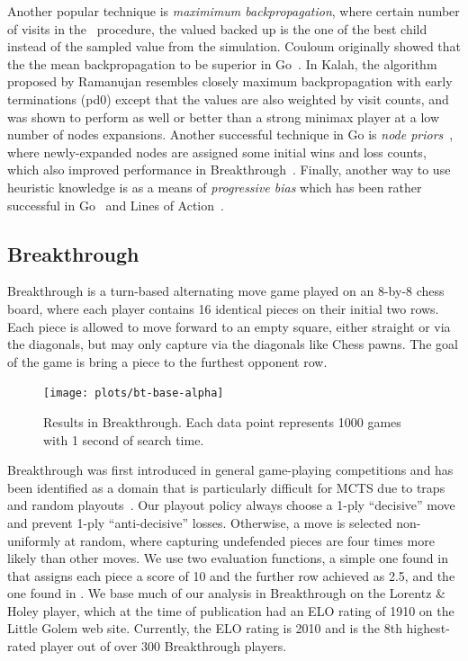 \documentclass[letterpaper]{article}
\begin{document}
Another popular technique is {\it maximimum backpropagation}, where certain number of visits in the \Update~procedure,
the valued backed up is the one of the best child instead of the sampled value from the simulation.
Couloum originally showed that the the mean backpropagation to be superior in Go~\cite{Coulom06Efficient}. 
In Kalah, the \UCTMAXH algorithm proposed by Ramanujan resembles closely maximum backpropagation with early terminations 
(pd0) except that the values are also weighted by visit counts, and was shown to perform as well or better than a strong minimax 
player at a low number of nodes expansions. Another successful technique in Go is 
{\it node priors}~\cite{Gelly07Combining}, where newly-expanded nodes are assigned some initial wins and loss counts, 
which also improved performance in Breakthrough~\cite{Lorentz13Breakthrough}. Finally, another way to use 
heuristic knowledge is as a means of {\it progressive bias} which has been rather successful
in Go~\cite{Gelly07Combining,ChaslotWHUB2008} and Lines of Action~\cite{Winands10MCTS-LOA}.

\subsection{Breakthrough}

Breakthrough is a turn-based alternating move game played on an 8-by-8 chess board, where each player 
contains 16 identical pieces on their initial two rows. 
Each piece is allowed to move forward to an empty square, either straight or via the diagonals, but may only 
capture via the diagonals like Chess pawns. The goal of the game is bring a piece to the furthest opponent row. 

\begin{figure}
\begin{center}
\texttt{[image: plots/bt-base-alpha]}
\caption{Results in Breakthrough. Each data point represents 1000 games with 1 second of search time.} 
\label{fig:bt-base-alpha}
\end{center}
\end{figure}

Breakthrough was first introduced in general game-playing competitions and has been identified as a domain 
that is particularly difficult for MCTS due to traps and random playouts~\cite{Gudmindsson13Sufficiency}. 
Our playout policy always choose a 1-ply ``decisive'' move and prevent 1-ply ``anti-decisive'' losses. 
Otherwise, a move is selected non-uniformly at random, where capturing undefended pieces are four times more
likely than other moves. We use two evaluation functions, a simple one found in \cite{Schadd11PhdThesis} 
that assigns each piece a score of 10 and the further row achieved as 2.5, and the one found in 
\cite{Lorentz13Breakthrough}. 
We base much of our analysis in Breakthrough on the Lorentz \& Holey player, which 
at the time of publication had an ELO rating of 1910 on the Little Golem web site. 
Currently, the ELO rating is 2010 and is the 8th highest-rated player out of over 300 Breakthrough players. 
\end{document}
